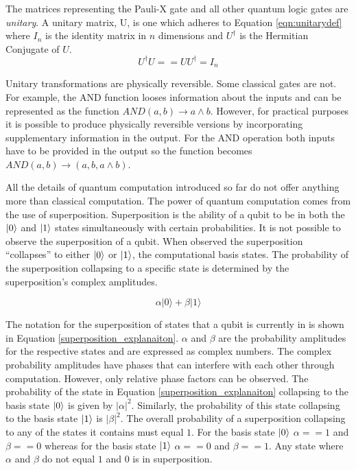 The matrices representing the Pauli-X gate and all other quantum logic gates are \emph{unitary}.
A unitary matrix, U, is one which adheres to Equation \ref{eqn:unitarydef} where $I_n$ is the identity matrix in $n$ dimensions and $U^{\dagger}$ is the Hermitian Conjugate of $U$.
\begin{equation}
\label{eqn:unitarydef}
U^{\dagger}
U == UU^{\dagger} = I_n
\end{equation}

Unitary transformations are physically reversible.
Some classical gates are not.
For example, the AND function looses information about the inputs and can be represented as the function $AND(a,b)\rightarrow{a\wedge{b}}$.
However, for practical purposes it is possible to produce physically reversible versions by incorporating supplementary information in the output.
For the AND operation both inputs have to be provided in the output so the function becomes $AND(a,b)\rightarrow{(a,b,a\wedge{b})}$.

All the details of quantum computation introduced so far do not offer anything more than classical computation.
The power of quantum computation comes from the use of superposition.
Superposition is the ability of a qubit to be in both the $\left\vert{0}\right\rangle$ and $\left\vert{1}\right\rangle$ states simultaneously with certain probabilities.
It is not possible to observe the superposition of a qubit.
When observed the superposition ``collapses'' to either $\left\vert{0}\right\rangle$ or $\left\vert{1}\right\rangle$, the computational basis states.
The probability of the superposition collapsing to a specific state is determined by the superposition's complex amplitudes.

\begin{equation}
\label{superposition_explanaiton}
\alpha\vert0\rangle+\beta\vert1\rangle
\end{equation}

The notation for the superposition of states that a qubit is currently in is shown in Equation \ref{superposition_explanaiton}.
$\alpha$ and $\beta$ are the probability amplitudes for the respective states and are expressed as complex numbers.
The complex probability amplitudes have phases that can interfere with each other through computation.
However, only relative phase factors can be observed.
The probability of the state in Equation \ref{superposition_explanaiton} collapsing to the basis state $\left\vert{0}\right\rangle$ is given by $\vert\alpha\vert^2$.
Similarly, the probability of this state collapsing to the basis state $\left\vert{1}\right\rangle$ is $\vert\beta\vert^2$.
The overall probability of a superposition collapsing to any of the states it contains must equal $1$.
For the basis state $\left\vert{0}\right\rangle$ $\alpha==1$ and $\beta==0$ whereas for the basis state $\left\vert{1}\right\rangle$ $\alpha==0$ and $\beta==1$.
Any state where $\alpha$ and $\beta$ do not equal $1$ and $0$ is in superposition.

